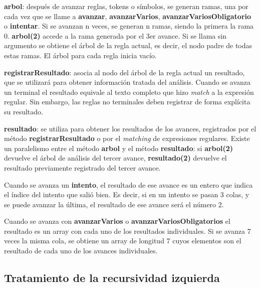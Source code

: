 \documentclass{report}
\begin{document}
	\vspace{10px}
	\noindent
	\textbf{arbol}: después de avanzar reglas, tokens o símbolos, se generan ramas, una por cada vez que se llame a \textbf{avanzar}, \textbf{avanzarVarios}, \textbf{avanzarVariosObligatorio} o \textbf{intentar}. Si se avanzan n veces, se generan n ramas, siendo la primera la rama 0. \textbf{arbol(2)} accede a la rama generada por el 3er avance. Si se llama sin argumento se obtiene el árbol de la regla actual, es decir, el nodo padre de todas estas ramas. El árbol para cada regla inicia vacío.
	
	\vspace{10px}
	\noindent
	\textbf{registrarResultado}: asocia al nodo del árbol de la regla actual un resultado, que se utilizará para obtener información tratada del análisis. Cuando se avanza un terminal el resultado equivale al texto completo que hizo \textit{match} a la expresión regular. Sin embargo, las reglas no terminales deben registrar de forma explícita su resultado. 
	
	\vspace{10px}
	\noindent
	\textbf{resultado}: se utiliza para obtener los resultados de los avances, registrados por el método \textbf{registrarResultado} o por el \textit{matching} de expresiones regulares. Existe un paralelismo entre el método \textbf{arbol} y el método \textbf{resultado}: si \textbf{arbol(2)} devuelve el árbol de análisis del tercer avance, \textbf{resultado(2)} devuelve el resultado previamente registrado del tercer avance.

	\vspace{10px}
	
	Cuando se avanza un \textbf{intento}, el resultado de ese avance es un entero que indica el índice del intento que salió bien. Es decir, si en un intento se pasan 3 colas, y se puede avanzar la última, el resultado de ese avance será el número 2. 
	
	\vspace{10px}
	
	Cuando se avanza con \textbf{avanzarVarios} o \textbf{avanzarVariosObligatorios} el resultado es un array con cada uno de los resultados individuales. Si se avanza 7 veces la misma cola, se obtiene un array de longitud 7 cuyos elementos son el resultado de cada uno de los avances individuales. 
	

	\subsection{Tratamiento de la recursividad izquierda}
	
\end{document}
